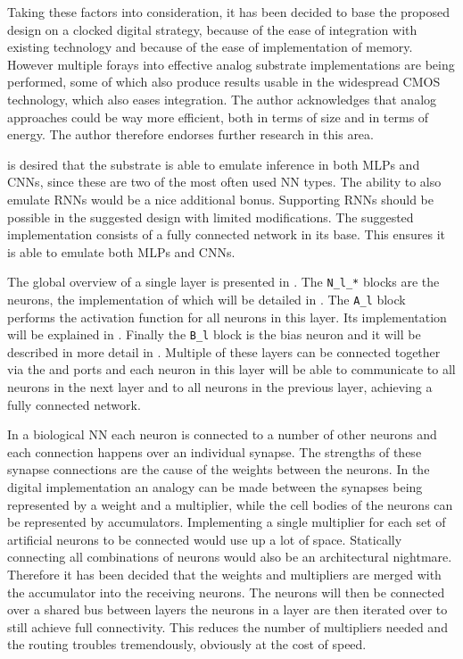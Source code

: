 Taking these factors into consideration, it has been decided to base the proposed design on a clocked digital strategy, because of the ease of integration with existing technology and because of the ease of implementation of memory. However multiple forays into effective analog substrate implementations are being performed, some of which also produce results usable in the widespread \ac{CMOS} technology, which also eases integration\cite{239745,81862,machofnewsoul}. The author acknowledges that analog approaches could be way more efficient, both in terms of size and in terms of energy. The author therefore endorses further research in this area.

 is desired that the substrate is able to emulate inference in both \acp{MLP} and \acp{CNN}, since these are two of the most often used \ac{NN} types\cite{8192463}. The ability to also emulate \acp{RNN} would be a nice additional bonus. Supporting \acp{RNN} should be possible in the suggested design with limited modifications.  The suggested implementation consists of a fully connected network in its base. This ensures it is able to emulate both \acp{MLP} and \acp{CNN}.

The global overview of a single layer is presented in . The \texttt{N\_l\_*} blocks are the neurons, the implementation of which will be detailed in . The \texttt{A\_l} block performs the activation function for all neurons in this layer. Its implementation will be explained in . Finally the \texttt{B\_l} block is the bias neuron and it will be described in more detail in . Multiple of these layers can be connected together via the  and  ports and each neuron in this layer will be able to communicate to all neurons in the next layer and to all neurons in the previous layer, achieving a fully connected network.

In a biological \ac{NN} each neuron is connected to a number of other neurons and each connection happens over an individual synapse. The strengths of these synapse connections are the cause of the weights between the neurons. In the digital implementation an analogy can be made between the synapses being represented by a weight and a multiplier, while the cell bodies of the neurons can be represented by accumulators. Implementing a single multiplier for each set of artificial neurons to be connected would use up a lot of space. Statically connecting all combinations of neurons would also be an architectural nightmare. Therefore it has been decided that the weights and multipliers are merged with the accumulator into the receiving neurons. The neurons will then be connected over a shared bus between layers the neurons in a layer are then iterated over to still achieve full connectivity. This reduces the number of multipliers needed and the routing troubles tremendously, obviously at the cost of speed.


